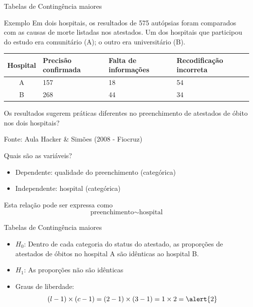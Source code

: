 \documentclass{beamer}
\begin{document}
\begin{frame}{\scriptsize Tabelas de Contingência maiores}
  \begin{exampleblock}{Exemplo}
    \footnotesize
    Em dois hospitais, os resultados de 575 autópsias
    foram comparados com as causas de morte listadas nos
    atestados. Um dos hospitais que participou do estudo era
    comunitário (A); o outro era universitário (B).

    \bigskip
    \scriptsize
    \begin{tabular}{c|p{2cm}|p{2cm}|p{2cm}}
      Hospital & Precisão confirmada & Falta de informações &
      Recodificação incorreta \\
      \hline
      A & 157 & 18 & 54 \\
      \hline
      B & 268 & 44 & 34 \\
    \end{tabular}
    \small
    \bigskip
    \bigskip
    Os resultados sugerem práticas diferentes no preenchimento de
    atestados de óbito nos dois hospitais?
  \end{exampleblock}
  \vfill
  {\hfill \footnotesize Fonte: Aula Hacker \& Simões (2008 - Fiocruz)}
\end{frame}

\begin{frame}{\scriptsize Quais são as variáveis?}
  \begin{itemize}
    \small
  \item Dependente: qualidade do preenchimento (categórica)
  \item Independente: hospital (categórica)
  \end{itemize}
  \vfill
  \begin{block}{Esta relação pode ser expressa como}
    \begin{displaymath}
      \text{preenchimento} \sim \text{hospital}
    \end{displaymath}
  \end{block}
\end{frame}

\begin{frame}{\scriptsize Tabelas de Contingência maiores}
  \begin{itemize}
    \small
  \item $H_0$: Dentro de cada categoria do status do atestado, as
    proporções de atestados de óbitos no hospital A são idênticas ao
    hospital B.
  \item $H_1$: As proporções não são idênticas
  \item Graus de liberdade:
    \begin{displaymath}
      (l -1)\times (c-1) = (2-1) \times (3-1)
      = 1 \times 2 = \alert{2}
    \end{displaymath}
  \end{itemize}
\end{frame}
\end{document}
